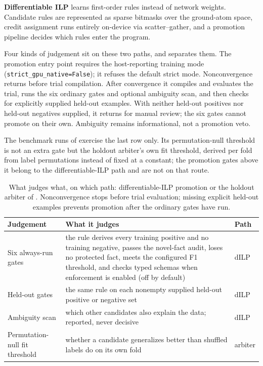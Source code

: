 \textbf{Differentiable ILP} learns first-order rules instead of network weights. Candidate rules are represented as sparse bitmasks over the ground-atom space, credit assignment runs entirely on-device via scatter--gather, and a promotion pipeline decides which rules enter the program.

Four kinds of judgement sit on these two paths, and  separates them. The promotion entry point requires the host-reporting training mode (\texttt{strict\_gpu\_native=False}); it refuses the default strict mode. Nonconvergence returns before trial compilation. After convergence it compiles and evaluates the trial, runs the six ordinary gates and optional ambiguity scan, and then checks for explicitly supplied held-out examples. With neither held-out positives nor held-out negatives supplied, it returns for manual review; the six gates cannot promote on their own. Ambiguity remains informational, not a promotion veto.

The benchmark runs of  exercise the last row only. Its permutation-null threshold is not an extra gate but the holdout arbiter's own fit threshold, derived per fold from label permutations instead of fixed at a constant; the promotion gates above it belong to the differentiable-ILP path and are not on that route.

\begin{table}[htbp]
  \centering
  \caption{What judges what, on which path: differentiable-ILP promotion or the holdout arbiter of . Nonconvergence stops before trial evaluation; missing explicit held-out examples prevents promotion after the ordinary gates have run.}
  \label{tab:gates}
  \footnotesize
  \setlength{\tabcolsep}{3pt}
  \begin{tabularx}{\columnwidth}{@{}>{\raggedright\arraybackslash}p{}Ll@{}}
    \toprule
    \textbf{Judgement} & \textbf{What it judges} & \textbf{Path} \\
    \midrule
    Six always-run gates & the rule derives every training positive and no training negative, passes the novel-fact audit, loses no protected fact, meets the configured F1 threshold, and checks typed schemas when enforcement is enabled (off by default) & dILP \\
    \addlinespace
    Held-out gates & the same rule on each nonempty supplied held-out positive or negative set & dILP \\
    \addlinespace
    Ambiguity scan & which other candidates also explain the data; reported, never decisive & dILP \\
    \addlinespace
    Permutation-null fit threshold & whether a candidate generalizes better than shuffled labels do on its own fold & arbiter \\
    \bottomrule
  \end{tabularx}
\end{table}

